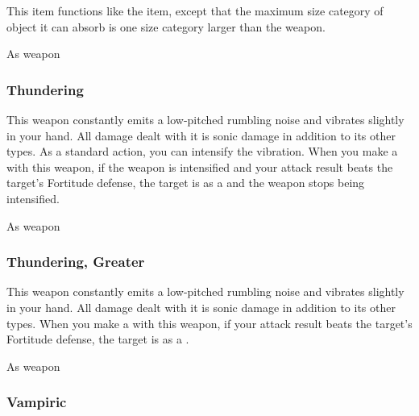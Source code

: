 This item functions like the  item, except that the maximum size category of object it can absorb is one size category larger than the weapon.



 


 As weapon


\lowercase{\hypertarget{item:Thundering}{}}\label{item:Thundering}
\hypertarget{item:Thundering}{\subsubsection{Thundering\hfill{}}}

This weapon constantly emits a low-pitched rumbling noise and vibrates slightly in your hand.
All damage dealt with it is sonic damage in addition to its other types.
As a standard action, you can intensify the vibration.
When you make a  with this weapon, if the weapon is intensified and your attack result beats the target's Fortitude defense,
the target is \deafened as a  and the weapon stops being intensified.



 


 As weapon


\lowercase{\hypertarget{item:Thundering, Greater}{}}\label{item:Thundering, Greater}
\hypertarget{item:Thundering, Greater}{\subsubsection{Thundering, Greater\hfill{}}}

This weapon constantly emits a low-pitched rumbling noise and vibrates slightly in your hand.
All damage dealt with it is sonic damage in addition to its other types.
When you make a  with this weapon, if your attack result beats the target's Fortitude defense, the target is \deafened as a .



 


 As weapon


\lowercase{\hypertarget{item:Vampiric}{}}\label{item:Vampiric}
\hypertarget{item:Vampiric}{\subsubsection{Vampiric\hfill{}}}

